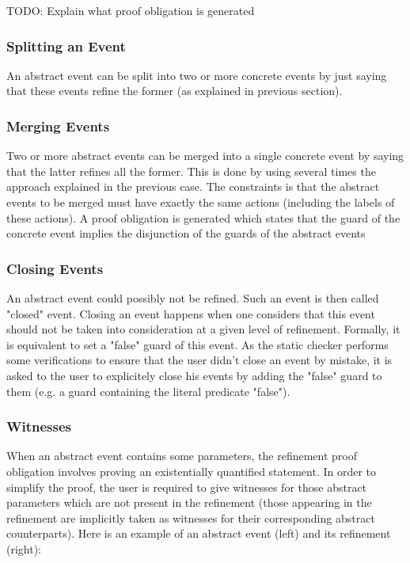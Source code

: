 TODO: Explain what proof obligation is generated 

\subsubsection{Splitting an Event}

An abstract event can be split into two or more concrete events by just saying that these events refine the former (as explained in previous section).

\subsubsection{Merging Events}

Two or more abstract events can be merged into a single concrete event by saying that the latter refines all the former. This is done by using several times the approach explained in the previous case. The constraints is that the abstract events to be merged must have exactly the same actions (including the labels of these actions). A proof obligation is generated which states that the guard of the concrete event implies the disjunction of the guards of the abstract events

\subsubsection{Closing Events}

An abstract event could possibly not be refined. Such an event is then called "closed" event. Closing an event happens when one considers that this event should not be taken into consideration at a given level of refinement. Formally, it is equivalent to set a "false" guard of this event. As the static checker performs some verifications to ensure that the user didn't close an event by mistake, it is asked to the user to explicitely close his events by adding the "false" guard to them (e.g. a guard containing the literal predicate "false").

\subsubsection{Witnesses}

When an abstract event contains some parameters, the refinement proof obligation involves proving an existentially quantified statement. In order to simplify the proof, the user is required to give witnesses for those abstract parameters which are not present in the refinement (those appearing in the refinement are implicitly taken as witnesses for their corresponding abstract counterparts). Here is an example of an abstract event (left) and its refinement (right): 

